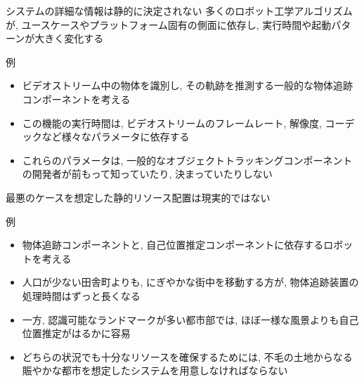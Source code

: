 \begin{frame}{システムの詳細な情報は静的に決定されない}
    多くのロボット工学アルゴリズムが, ユースケースやプラットフォーム固有の側面に依存し, 実行時間や起動パターンが大きく変化する
    \begin{block}{例}
        \setlength{\linewidth}{0.98\columnwidth}
        \begin{itemize}
            \item ビデオストリーム中の物体を識別し, その軌跡を推測する一般的な物体追跡コンポーネントを考える
            \item この機能の実行時間は, ビデオストリームのフレームレート, 解像度, コーデックなど様々なパラメータに依存する
            \item これらのパラメータは, 一般的なオブジェクトトラッキングコンポーネントの開発者が前もって知っていたり, 決まっていたりしない
        \end{itemize}
    \end{block}
\end{frame}


\begin{frame}{最悪のケースを想定した静的リソース配置は現実的ではない}
    \begin{block}{例}
        \setlength{\linewidth}{0.98\columnwidth}
        \begin{itemize}
            \item 物体追跡コンポーネントと, 自己位置推定コンポーネントに依存するロボットを考える
            \item 人口が少ない田舎町よりも, にぎやかな街中を移動する方が, 物体追跡装置の処理時間はずっと長くなる
            \item 一方, 認識可能なランドマークが多い都市部では, ほぼ一様な風景よりも自己位置推定がはるかに容易
            \item どちらの状況でも十分なリソースを確保するためには, 不毛の土地からなる賑やかな都市を想定したシステムを用意しなければならない
        \end{itemize}
    \end{block}
\end{frame}

